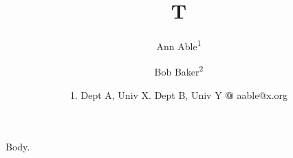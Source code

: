 \documentclass{article}
\begin{document}
\title{T}
\author{Ann Able\textsuperscript{1} \and Bob Baker\textsuperscript{2}}
\date{1. Dept A, Univ X. Dept B, Univ Y\break
\textbf{@} aable@x.org}
\maketitle
Body.
\end{document}
